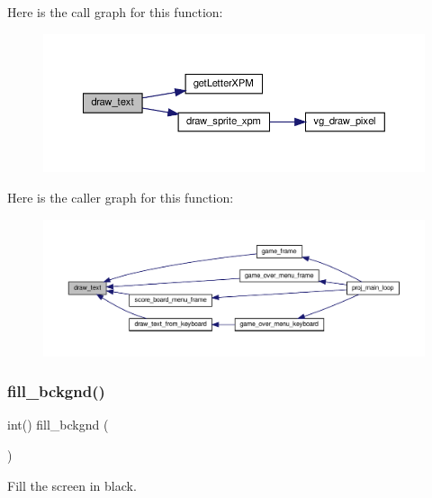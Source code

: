 Here is the call graph for this function\+:
\nopagebreak
\begin{figure}[H]
\begin{center}
\leavevmode
\includegraphics[width=350pt]{group__graphics_ga37cbb1079da920cd529418d4a9f83ff2_cgraph}
\end{center}
\end{figure}
Here is the caller graph for this function\+:
\nopagebreak
\begin{figure}[H]
\begin{center}
\leavevmode
\includegraphics[width=350pt]{group__graphics_ga37cbb1079da920cd529418d4a9f83ff2_icgraph}
\end{center}
\end{figure}
\mbox{\label{group__graphics_ga97ef658560a953fdb5a8ac8310b31516}} 
\subsubsection{\texorpdfstring{fill\+\_\+bckgnd()}{fill\_bckgnd()}}
{\footnotesize\ttfamily int() fill\+\_\+bckgnd (\begin{DoxyParamCaption}{ }\end{DoxyParamCaption})}



Fill the screen in black. 


